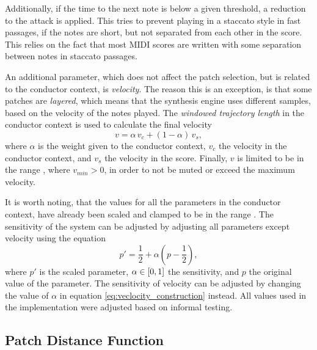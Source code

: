 Additionally, if the time to the next note is below a given threshold,
a reduction to the attack is applied.
This tries to prevent playing in a staccato style in fast passages,
if the notes are short, but not separated from each other in the score.
This relies on the fact that most MIDI scores are written
with some separation between notes in staccato passages.

An additional parameter, which does not affect the patch selection,
but is related to the conductor context,
is \textit{velocity}.
The reason this is an exception,
is that some patches are \textit{layered},
which means that the synthesis engine
uses different samples,
based on the velocity of the notes played.
The \textit{windowed trajectory length} in the conductor context
is used to calculate the final velocity
\begin{equation}
v = \alpha \, v_c + (1 - \alpha) \, v_s,
\label{eq:veclocity_construction}
\end{equation}
where $\alpha$ is the weight given to the conductor context,
$v_c$ the velocity in the conductor context,
and $v_s$ the velocity in the score.
Finally, $v$ is limited to be in the range
, where $v_{min} > 0$,
in order to not be muted or exceed the maximum velocity.

It is worth noting,
that the values for all the parameters
in the conductor context,
have already been scaled and clamped
to be in the range .
The sensitivity of the system
can be adjusted by adjusting all parameters
except velocity using the equation
\begin{equation}
p' = \dfrac{1}{2} + \alpha \left ( p - \dfrac{1}{2} \right ),
\end{equation}
where $p'$ is the scaled parameter,
$\alpha \in \mathopen[ 0, 1 \mathclose]$ the sensitivity,
and $p$ the original value of the parameter.
The sensitivity of velocity can be adjusted
by changing the value of $\alpha$
in equation \ref{eq:veclocity_construction} instead.
All values used in the implementation were
adjusted based on informal testing.

\subsection{Patch Distance Function}

